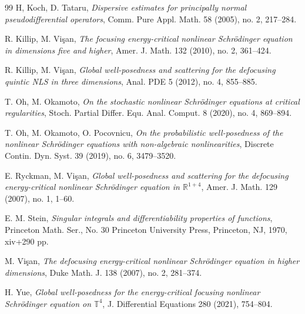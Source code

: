 \documentclass[letterpaper, 11pt,  reqno]{amsart}
\newcommand{\1}{\hspace{0.5mm}\text{I}\hspace{0.5mm}}
\newcommand{\R}{\mathbb{R}}
\newcommand{\T}{\mathbb{T}}
\numberwithin{equation}{section}
\numberwithin{theorem}{section}
\begin{document}
\begin{thebibliography}{99}
H, Koch, D. Tataru,
{\it  Dispersive estimates for principally normal pseudodifferential operators},
 Comm. Pure Appl. Math. 58 (2005), no. 2, 217--284.






R. Killip, M. Vi\c{s}an,
{\it The focusing energy-critical nonlinear Schr\"odinger equation in dimensions five and higher},
Amer. J. Math. 132 (2010), no. 2, 361--424.



R. Killip, M. Vi\c{s}an,
{\it Global well-posedness and scattering for the defocusing quintic NLS in three dimensions},
Anal. PDE 5 (2012), no. 4, 855--885.




T. Oh, M. Okamoto,
{\it On the stochastic nonlinear Schr\"odinger equations at critical regularities},
Stoch. Partial Differ. Equ. Anal. Comput. 8 (2020), no. 4, 869--894.


T. Oh, M. Okamoto, O. Pocovnicu,
{\it On the probabilistic well-posedness of the nonlinear Schr\"odinger equations with non-algebraic nonlinearities},
Discrete Contin. Dyn. Syst. 39 (2019), no. 6, 3479--3520.



E. Ryckman, M. Vi\c{s}an,
{\it Global well-posedness and scattering for the defocusing energy-critical nonlinear Schr\"odinger equation in $\R^{1+4}$},
Amer. J. Math. 129 (2007), no. 1, 1--60.

E. M. Stein,
{\it Singular integrals and differentiability properties of functions},
Princeton Math. Ser., No. 30
Princeton University Press, Princeton, NJ, 1970, xiv+290 pp.


M. Vi\c{s}an,
{\it The defocusing energy-critical nonlinear Schr\"odinger equation in higher dimensions},
Duke Math. J. 138 (2007), no. 2, 281--374.


H. Yue,
{\it Global well-posedness for the energy-critical focusing nonlinear Schr\"odinger equation on $\T^4$},
J. Differential Equations 280 (2021), 754--804.

\end{thebibliography}
\end{document}
